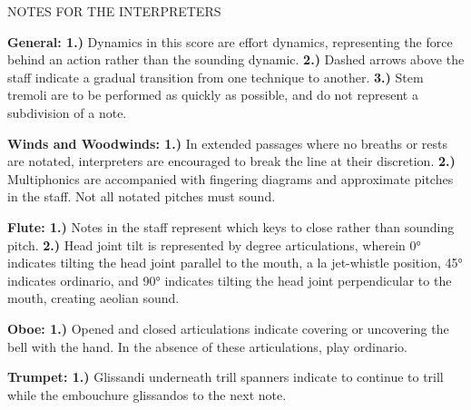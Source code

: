 \documentclass[11pt]{article}
\begin{document}
\begin{center}
\huge NOTES FOR THE INTERPRETERS
\end{center}

\begingroup
\begin{center}
\textbf{General: 1.)} Dynamics in this score are effort dynamics, representing the force behind an action rather than the sounding dynamic. \textbf{2.)} Dashed arrows above the staff indicate a gradual transition from one technique to another. \textbf{3.)}  Stem tremoli are to be performed as quickly as possible, and do not represent a subdivision of a note. \\
\rightskip\leftskip
\end{center}
\endgroup

\begingroup
\begin{center}
\textbf{Winds and Woodwinds: 1.)} In extended passages where no breaths or rests are notated, interpreters are encouraged to break the line at their discretion. \textbf{2.)} Multiphonics are accompanied with fingering diagrams and approximate pitches in the staff. Not all notated pitches must sound. \\
\rightskip\leftskip
\end{center}
\endgroup

\begingroup
\begin{center}
\textbf{Flute: 1.)} Notes in the staff represent which keys to close rather than sounding pitch. \textbf{2.)} Head joint tilt is represented by degree articulations, wherein 0° indicates tilting the head joint parallel to the mouth, a la jet-whistle position, 45° indicates ordinario, and 90° indicates tilting the head joint perpendicular to the mouth, creating aeolian sound. \\ 
\rightskip\leftskip
\end{center}
\endgroup

\begingroup
\begin{center}
\textbf{Oboe: 1.)} Opened and closed articulations indicate covering or uncovering the bell with the hand. In the absence of these articulations, play ordinario. \\
\rightskip\leftskip
\end{center}
\endgroup

\begingroup
\begin{center}
\textbf{Trumpet: 1.)} Glissandi underneath trill spanners indicate to continue to trill while the embouchure glissandos to the next note. \\
\rightskip\leftskip
\end{center}
\endgroup
\end{document}
